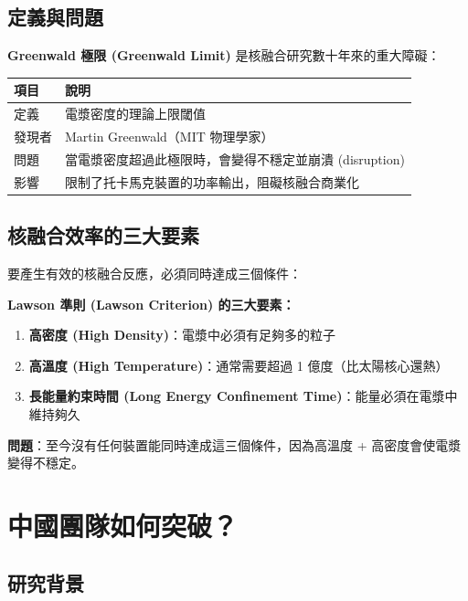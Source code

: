 \documentclass[11pt,a4paper]{article}
\begin{document}
\subsection{定義與問題}

\textbf{Greenwald 極限 (Greenwald Limit)} 是核融合研究數十年來的重大障礙：

\begin{longtable}{p{3cm}p{11cm}}
\toprule
\textbf{項目} & \textbf{說明} \\
\midrule
\endfirsthead
\bottomrule
\endfoot
定義 & 電漿密度的理論上限閾值 \\
\midrule
發現者 & Martin Greenwald（MIT 物理學家） \\
\midrule
問題 & 當電漿密度超過此極限時，會變得不穩定並崩潰 (disruption) \\
\midrule
影響 & 限制了托卡馬克裝置的功率輸出，阻礙核融合商業化 \\
\bottomrule
\end{longtable}

\subsection{核融合效率的三大要素}

要產生有效的核融合反應，必須同時達成三個條件：

\begin{importantbox}
\textbf{Lawson 準則 (Lawson Criterion) 的三大要素：}
\begin{enumerate}[leftmargin=*,itemsep=3pt]
    \item \textbf{高密度 (High Density)}：電漿中必須有足夠多的粒子
    \item \textbf{高溫度 (High Temperature)}：通常需要超過 1 億度（比太陽核心還熱）
    \item \textbf{長能量約束時間 (Long Energy Confinement Time)}：能量必須在電漿中維持夠久
\end{enumerate}

\textbf{問題}：至今沒有任何裝置能同時達成這三個條件，因為高溫度 + 高密度會使電漿變得不穩定。
\end{importantbox}

\section{中國團隊如何突破？}

\subsection{研究背景}
\end{document}
